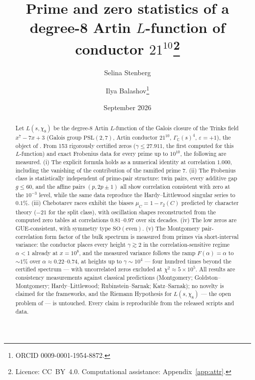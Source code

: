\documentclass[11pt]{article}
\title{\textbf{Prime and zero statistics of a degree-8 Artin $L$-function of
conductor $21^{10}$}\thanks{Licence: CC~BY~4.0. Computational assistance:
Appendix~\ref{app:attr}.}}
\author{Selina Stenberg \and Ilya Balashov\thanks{ORCID
0009-0001-1954-8872.}}
\date{September 2026}
\newcommand{\Lgen}{L(s,\chi_8)}
\begin{document}
\maketitle

\begin{abstract}
Let $\Lgen$ be the degree-8 Artin $L$-function of the Galois closure of the
Trinks field $x^7-7x+3$ (Galois group $\mathrm{PSL}(2,7)$, Artin conductor
$21^{10}$, $\Gamma_{\mathbb C}(s)^4$, $\varepsilon=+1$), the object of
\cite{mainpaper}. From 153 rigorously certified zeros ($\gamma\le 27.911$, the
first computed for this $L$-function) and exact Frobenius data for every prime
up to $10^{10}$, the following are measured. (i) The explicit formula holds as
a numerical identity at correlation $1.000$, including the vanishing of the
contribution of the ramified prime $7$. (ii) The Frobenius class is
statistically independent of prime-pair structure: twin pairs, every additive
gap $g\le 60$, and the affine pairs $(p,2p\pm1)$ all show correlation
consistent with zero at the $10^{-3}$ level, while the same data reproduce the
Hardy--Littlewood singular series to $0.1\%$. (iii) Chebotarev races exhibit
the biases $\mu_C=1-r_2(C)$ predicted by character theory ($-21$ for the split
class), with oscillation shapes reconstructed from the computed zero tables at
correlations $0.81$--$0.97$ over six decades. (iv) The low zeros are
GUE-consistent, with symmetry type $\mathrm{SO(even)}$. (v) The Montgomery
pair-correlation form factor of the bulk spectrum is measured from primes via
short-interval variance: the conductor places every height $\gamma\gtrsim 2$
in the correlation-sensitive regime $\alpha<1$ already at $x=10^8$, and the
measured variance follows the ramp $F(\alpha)=\alpha$ to $\sim\!1\%$ over
$\alpha\approx0.22$--$0.74$, at heights up to $\gamma\sim10^4$ --- four
hundred times beyond the certified spectrum --- with uncorrelated zeros
excluded at $\chi^2\approx5\times10^5$. All results are consistency
measurements against classical predictions (Montgomery; Goldston--Montgomery;
Hardy--Littlewood; Rubinstein--Sarnak; Katz--Sarnak); no novelty is claimed
for the frameworks, and the Riemann Hypothesis for $\Lgen$ --- the open
problem of \cite{mainpaper} --- is untouched. Every claim is reproducible from
the released scripts and data.
\end{abstract}
\end{document}
